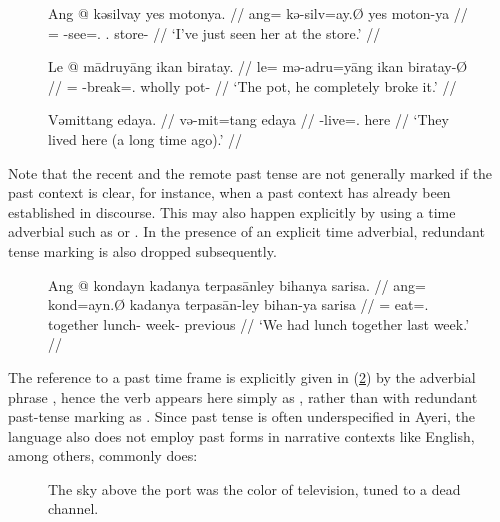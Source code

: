 \begin{figure}
\pex
\a\label{ex:npst}\begingl
	\gla Ang @ kəsilvay yes motonya. //
	\glb ang= kə-silv=ay.Ø yes moton-ya //
	\glc \AgtT{}= \NPst{}-see=\Fsg{}.\Top{} \TsgF{}.\Parg{} store-\Loc{} //
	\glft `I've just seen her at the store.' //
\endgl

\a\label{ex:pst}\begingl
	\gla Le @ mādruyāng ikan biratay. //
	\glb le= mə-adru=yāng ikan biratay-Ø //
	\glc \PatTI{}= \Pst{}-break=\TsgM{}.\Aarg{} wholly pot-\Top{} //
	\glft `The pot, he completely broke it.' //
\endgl

\a\label{ex:rpst}\begingl
	\gla Vəmittang edaya. //
	\glb və-mit=tang edaya //
	\glc \RPst{}-live=\TplM{}.\Aarg{} here //
	\glft `They lived here (a long time ago).' //
\endgl
\xe
\end{figure}

Note that the recent and the remote past tense are not generally marked if the 
past context is clear, for instance, when a past context has already been 
established in discourse. This may also happen explicitly by using a time 
adverbial such as  or . In the presence of an 
explicit time adverbial, redundant tense marking is also dropped subsequently.

\begin{figure}
\ex\label{ex:pstnopst}\begingl
	\gla Ang @ kondayn kadanya terpasānley bihanya sarisa. //
	\glb ang= kond=ayn.Ø kadanya terpasān-ley bihan-ya sarisa //
	\glc \AgtT{}= eat=\Fpl{}.\Top{} together lunch-\PargI{} week-\Loc{}
		previous //
	\glft `We had lunch together last week.' //
\endgl\xe
\end{figure}

The reference to a past time frame is explicitly given in (\ref{ex:pstnopst})
by the adverbial phrase , hence
the verb appears here simply as , rather than with
redundant past-tense marking as . Since past tense is
often underspecified in Ayeri, the language also does not employ past forms in
narrative contexts like English, among others, commonly does:

\begin{figure}[h!]
\ex\label{ex:neuromancer}
	The sky above the port was the color of television, tuned to a dead 
	channel. 
\xe
\end{figure}

